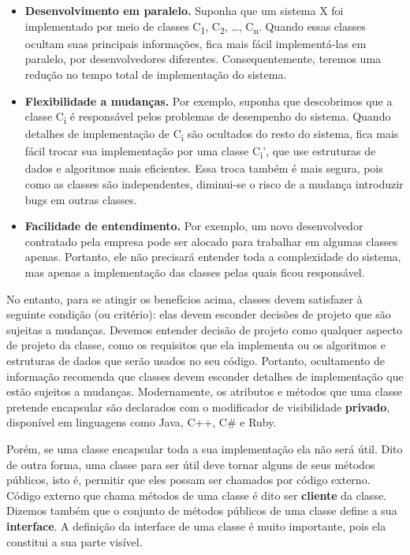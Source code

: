 \documentclass[
  11pt,
  twoside]{book}
\begin{document}
\begin{itemize}
\item
  \textbf{Desenvolvimento em paralelo.} Suponha que um sistema X foi
  implementado por meio de classes C\textsubscript{1},
  C\textsubscript{2}, \ldots, C\textsubscript{n}. Quando essas classes
  ocultam suas principais informações, fica mais fácil implementá-las em
  paralelo, por desenvolvedores diferentes. Consequentemente, teremos
  uma redução no tempo total de implementação do sistema.
\item
  \textbf{Flexibilidade a mudanças.} Por exemplo, suponha que
  descobrimos que a classe C\textsubscript{i} é responsável pelos
  problemas de desempenho do sistema. Quando detalhes de implementação
  de C\textsubscript{i} são ocultados do resto do sistema, fica mais
  fácil trocar sua implementação por uma classe C\textsubscript{i}', que
  use estruturas de dados e algoritmos mais eficientes. Essa troca
  também é mais segura, pois como as classes são independentes,
  diminui-se o risco de a mudança introduzir bugs em outras classes.
\item
  \textbf{Facilidade de entendimento.} Por exemplo, um novo
  desenvolvedor contratado pela empresa pode ser alocado para trabalhar
  em algumas classes apenas. Portanto, ele não precisará entender toda a
  complexidade do sistema, mas apenas a implementação das classes pelas
  quais ficou responsável.
\end{itemize}

No entanto, para se atingir os benefícios acima, classes devem
satisfazer à seguinte condição (ou critério): elas devem esconder
decisões de projeto que são sujeitas a mudanças. Devemos entender
decisão de projeto como qualquer aspecto de projeto da classe, como os
requisitos que ela implementa ou os algoritmos e estruturas de dados que
serão usados no seu código. Portanto, ocultamento de informação
recomenda que classes devem esconder detalhes de implementação que estão
sujeitos a mudanças. Modernamente, os atributos e métodos que uma classe
pretende encapsular são declarados com o modificador de visibilidade
\textbf{privado}, disponível em linguagens como Java, C++, C\# e Ruby.

Porém, se uma classe encapsular toda a sua implementação ela não será
útil. Dito de outra forma, uma classe para ser útil deve tornar alguns
de seus métodos públicos, isto é, permitir que eles possam ser chamados
por código externo. Código externo que chama métodos de uma classe é
dito ser \textbf{cliente} da classe. Dizemos também que o conjunto de
métodos públicos de uma classe define a sua \textbf{interface}. A
definição da interface de uma classe é muito importante, pois ela
constitui a sua parte visível.
\end{document}
